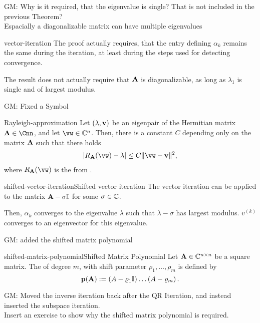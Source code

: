 \begin{todo}
  GM:
  Why is it required, that the eigenvalue is single? That is not included in the previous Theorem? \\
  Espacially a diagonalizable matrix can have multiple eigenvalues
\end{todo}
\begin{Remark}{vector-iteration}
  The proof actually requires, that the entry defining $\alpha_k$
  remains the same during the iteration, at least during the steps
  used for detecting convergence.

  The result does not actually require that $\mathbf A$ is diagonalizable,
  as long as $\lambda_1$ is single and of largest modulus.
\end{Remark}

\begin{todo}
  GM:
  Fixed a Symbol
\end{todo}
\begin{Lemma}{Rayleigh-approximation}
  Let $(\lambda,\mathbf v)$ be an eigenpair of the Hermitian matrix
  $\mata\in\Cnn$, and let $\vw\in\C^n$. Then, there is a constant $C$ depending only on the matrix $\mathbf A$ such that there holds
  \begin{gather}
    \abs{R_\mata(\vw)-\lambda} \le C \norm{\vw-\vv}^2,
  \end{gather}
  where $R_\mata(\vw)$ is the  from
  .
\end{Lemma}

\begin{Algorithm*}{shifted-vector-iteration}{Shifted vector iteration}
  The vector iteration can be applied to the matrix $\mathbf A-\sigma\mathbb I$
  for some $\sigma\in\mathbb C$.

  Then, $\alpha_k$ converges to the eigenvalue $\lambda$ such that
  $\lambda-\sigma$ has largest modulus. $v^{(k)}$ converges to an
  eigenvector for this eigenvalue.
\end{Algorithm*}

\begin{todo}
  GM: added the shifted matrix polynomial
\end{todo}
\begin{Definition}{shifted-matrix-polynomial}{Shifted Matrix Polynomial}
  Let \(\mathbf A \in \mathbb C^{n \times n}\) be a square matrix.
  The  of degree \(m\), with shift parameter \(\rho_1, \ldots, \rho_m\) is defined by
  \[ \mathbf{p(A)} := \left( A - \varrho_1 \mathbb I \right) \dots \left( A - \varrho_m\right).\]
\end{Definition}

\begin{todo}
  GM:
  Moved the inverse iteration back after the QR Iteration, and instead inserted the subspace iteration.\\
  Insert an exercise to show why the shifted matrix polynomial is required.
\end{todo}


